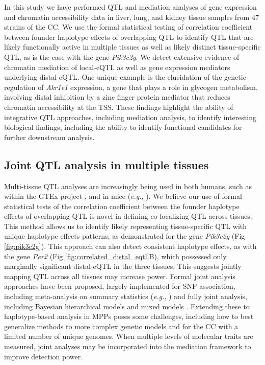 \documentclass[10pt,letterpaper]{article}
\newcommand{\eg}{\emph{e.g.}\xspace}
\begin{document}
In this study we have performed QTL and mediation analyses of gene expression and chromatin accessibility data in liver, lung, and kidney tissue samples from 47 strains of the CC. We use the formal statistical testing of correlation coefficient between founder haplotype effects of overlapping QTL to identify QTL that are likely functionally active in multiple tissues as well as likely distinct tissue-specific QTL, as is the case with the gene \textit{Pik3c2g}. We detect extensive evidence of chromatin mediation of local-eQTL as well as gene expression mediators underlying distal-eQTL. One unique example is the elucidation of the genetic regulation of \textit{Akr1e1} expression, a gene that plays a role in glycogen metabolism, involving distal inhibition by a zinc finger protein mediator that reduces chromatin accessibility at the TSS. These findings highlight the ability of integrative QTL approaches, including mediation analysis, to identify interesting biological findings, including the ability to identify functional candidates for further downstream analysis.

\subsection*{Joint QTL analysis in multiple tissues}

Multi-tissue QTL analyses are increasingly being used in both humans, such as within the GTEx project \cite{GTEX2017}, 
and in mice (\eg, \cite{Huang2009}).
We believe our use of formal statistical tests of the correlation coefficient between the founder haplotype effects of overlapping QTL is novel in defining co-localizing QTL across tissues. This method allows us to identify likely representing tissue-specific QTL with unique haplotype effects patterns, as demonstrated for the gene \textit{Pik3c2g} (Fig \ref{fig:pik3c2g}).
This approach can also detect consistent haplotype effects, as with the gene \textit{Per2} (Fig \ref{fig:correlated_distal_eqtl}B), which possessed only marginally significant distal-eQTL in the three tissues. This suggests jointly mapping QTL across all tissues may increase power. Formal joint analysis approaches have been proposed, largely implemented for SNP association, including meta-analysis on summary statistics (\eg, \cite{Fu2012a, Sul2013}) and fully joint analysis, including Bayesian hierarchical models \cite{Flutre2013} and mixed models \cite{Acharya2016}. Extending these to haplotype-based analysis in MPPs poses some challenges, including how to best generalize methods to more complex genetic models and for the CC with a limited number of unique genomes. 
When multiple levels of molecular traits are measured, joint analyses may be incorporated into the mediation framework to improve detection power.
\end{document}

